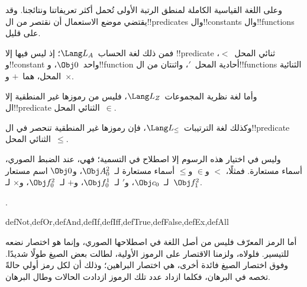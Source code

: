 \documentclass[../../../include/open-logic-section]{subfiles}
\begin{document}
وعلى اللغة القياسية الكاملة لمنطق الرتبة الأولى تُحمل أكثر
تعريفاتنا ونتائجنا. وقد يقتضي موضع الاستعمال أن نقتصر من
ال!!{predicate}s وال!!{constant}s وال!!{function}s على قليل.

\begin{ex}
فمن ذلك لغة الحساب~$\Lang L_A$؛ إذ ليس فيها إلا !!{predicate}
ثنائي المحل~$<$، و!!{constant} واحد~$\Obj 0$، و!!{function}
أحادية المحل~$\prime$، واثنتان من ال!!{function}s الثنائية المحل، هما~$+$ و~$\times$.
\end{ex}

\begin{ex}
وأما لغة نظرية المجموعات~$\Lang L_Z$، فليس من رموزها غير المنطقية
إلا ال!!{predicate} الثنائي المحل~$\in$.
\end{ex}

\begin{ex}
وكذلك لغة الترتيبات~$\Lang L_\le$، فإن رموزها غير المنطقية تنحصر في
ال!!{predicate} الثنائي المحل~$\le$.
\end{ex}

وليس في اختيار هذه الرسوم إلا اصطلاح في التسمية؛ فهي، عند الضبط
الصوري، أسماء مستعارة. فمثلًا، $<$
و$\in$ و$\le$ أسماء مستعارة لـ~$\Obj A^2_0$، و$\Obj 0$ اسم مستعار
لـ~$\Obj c_0$، و$\prime$ لـ~$\Obj f^1_0$، و$+$ لـ~$\Obj f^2_0$،
و$\times$ لـ~$\Obj f^2_1$.

.

\begin{tagblock}{defNot,defOr,defAnd,defIf,defIff,defTrue,defFalse,defEx,defAll}
\begin{explain}
أما الرمز المعرّف فليس من أصل اللغة في اصطلاحها الصوري، وإنما هو
اختصار نضعه للتيسير. فلولاه، ولزمنا الاقتصار على الرموز الأولية،
لطالت بعض الصيغ طولًا شديدًا. وفوق اختصار الصيغ فائدة أخرى، هي
اختصار البراهين؛ وذلك أن لكل رمز أولي حالةً تخصه في البرهان،
فكلما ازداد عدد تلك الرموز ازدادت الحالات وطال البرهان.
\end{explain}
\end{tagblock}
\end{document}
